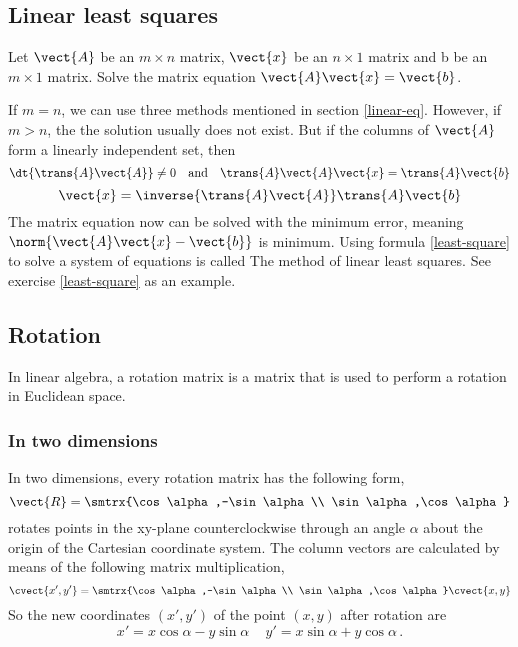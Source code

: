 \subsection{Linear least squares}
Let $\vect{A}$ be an $m\times n$ matrix, $\vect{x}$ be an $n\times 1$ matrix and b be an $m\times 1$ matrix. Solve the matrix equation $\vect{A}\vect{x}=\vect{b}$.\par 
If $m=n$, we can use three methods mentioned in section \ref{linear-eq}. However, if $m>n$, the the solution usually does not exist. But if the columns of $\vect{A}$ form a linearly independent set, then 
\begin{equation}
\dt{\trans{A}\vect{A}}\neq 0 \quad \text{and} \quad \trans{A}\vect{A}\vect{x}=\trans{A}\vect{b}
\end{equation}
\begin{equation}\label{least-square}
\vect{x}=\inverse{\trans{A}\vect{A}}\trans{A}\vect{b}
\end{equation}
The matrix equation now can be solved with the minimum error, meaning $\norm{\vect{A}\vect{x}-\vect{b}}$ is minimum. Using formula \eqref{least-square} to solve a system of equations is called The method of linear least squares. See exercise \ref{least-square} as an example.
\subsection{Rotation}
In linear algebra, a rotation matrix is a matrix that is used to perform a rotation in Euclidean space.
\subsubsection{In two dimensions}
In two dimensions, every rotation matrix has the following form,
\[ \vect{R}=\smtrx{\cos\alpha,-\sin\alpha\\ \sin\alpha,\cos\alpha} \]
rotates points in the xy-plane counterclockwise through an angle $\alpha$ about the origin of the Cartesian coordinate system. The column vectors are calculated by means of the following matrix multiplication,
\begin{equation*}
\cvect{x',y'}=\smtrx{\cos\alpha,-\sin\alpha\\ \sin\alpha,\cos\alpha}\cvect{x,y}
\end{equation*}
So the new coordinates $\left( x',y' \right)$ of the point $\left( x,y \right)$ after rotation are
\[
 x'=x\cos \alpha -y\sin \alpha \, \quad
 y'=x\sin \alpha +y\cos \alpha \,.
\]
